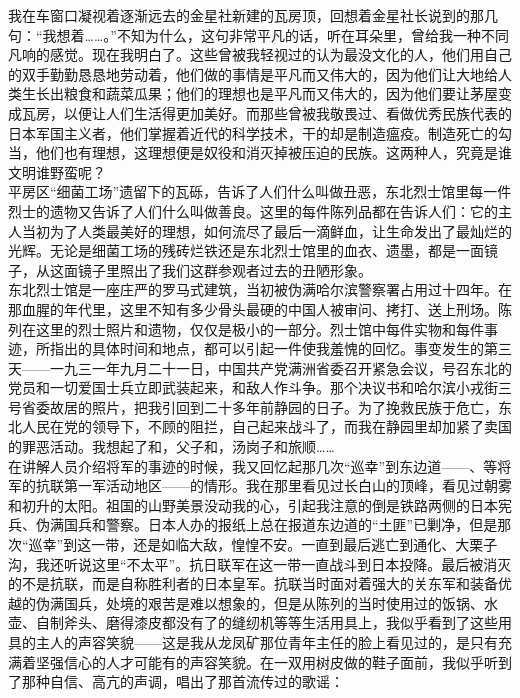 我在车窗口凝视着逐渐远去的金星社新建的瓦房顶，回想着金星社长说到的那几句：“我想着……。”不知为什么，这句非常平凡的话，听在耳朵里，曾给我一种不同凡响的感觉。现在我明白了。这些曾被我轻视过的认为最没文化的人，他们用自己的双手勤勤恳恳地劳动着，他们做的事情是平凡而又伟大的，因为他们让大地给人类生长出粮食和蔬菜瓜果；他们的理想也是平凡而又伟大的，因为他们要让茅屋变成瓦房，以便让人们生活得更加美好。而那些曾被我敬畏过、看做优秀民族代表的日本军国主义者，他们掌握着近代的科学技术，干的却是制造瘟疫。制造死亡的勾当，他们也有理想，这理想便是奴役和消灭掉被压迫的民族。这两种人，究竟是谁文明谁野蛮呢？\\

平房区“细菌工场”遗留下的瓦砾，告诉了人们什么叫做丑恶，东北烈士馆里每一件烈士的遗物又告诉了人们什么叫做善良。这里的每件陈列品都在告诉人们：它的主人当初为了人类最美好的理想，如何流尽了最后一滴鲜血，让生命发出了最灿烂的光辉。无论是细菌工场的残砖烂铁还是东北烈士馆里的血衣、遗墨，都是一面镜子，从这面镜子里照出了我们这群参观者过去的丑陋形象。\\

东北烈士馆是一座庄严的罗马式建筑，当初被伪满哈尔滨警察署占用过十四年。在那血腥的年代里，这里不知有多少骨头最硬的中国人被审问、拷打、送上刑场。陈列在这里的烈士照片和遗物，仅仅是极小的一部分。烈士馆中每件实物和每件事迹，所指出的具体时间和地点，都可以引起一件使我羞愧的回忆。事变发生的第三天——一九三一年九月二十一日，中国共产党满洲省委召开紧急会议，号召东北的党员和一切爱国士兵立即武装起来，和敌人作斗争。那个决议书和哈尔滨小戎街三号省委故居的照片，把我引回到二十多年前静园的日子。为了挽救民族于危亡，东北人民在党的领导下，不顾的阻拦，自己起来战斗了，而我在静园里却加紧了卖国的罪恶活动。我想起了和，父子和，汤岗子和旅顺……\\

在讲解人员介绍将军的事迹的时候，我又回忆起那几次“巡幸”到东边道——、等将军的抗联第一军活动地区——的情形。我在那里看见过长白山的顶峰，看见过朝雾和初升的太阳。祖国的山野美景没动我的心，引起我注意的倒是铁路两侧的日本宪兵、伪满国兵和警察。日本人办的报纸上总在报道东边道的“土匪”已剿净，但是那次“巡幸”到这一带，还是如临大敌，惶惶不安。一直到最后逃亡到通化、大栗子沟，我还听说这里“不太平”。抗日联军在这一带一直战斗到日本投降。最后被消灭的不是抗联，而是自称胜利者的日本皇军。抗联当时面对着强大的关东军和装备优越的伪满国兵，处境的艰苦是难以想象的，但是从陈列的当时使用过的饭锅、水壶、自制斧头、磨得漆皮都没有了的缝纫机等等生活用具上，我似乎看到了这些用具的主人的声容笑貌——这是我从龙凤矿那位青年主任的脸上看见过的，是只有充满着坚强信心的人才可能有的声容笑貌。在一双用树皮做的鞋子面前，我似乎听到了那种自信、高亢的声调，唱出了那首流传过的歌谣：\\

